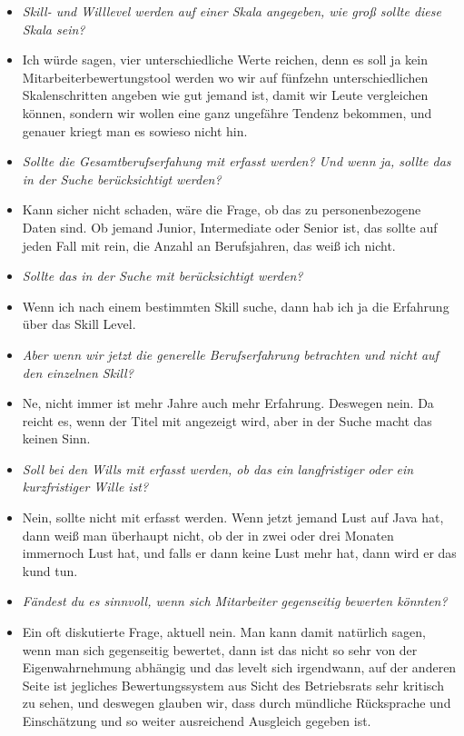 \begin{appendices}
\begin{itemize}
\item[] \textit{Skill- und Willlevel werden auf einer Skala angegeben, wie groß sollte diese Skala sein?}
\item[] Ich würde sagen, vier unterschiedliche Werte reichen, denn es soll ja kein Mitarbeiterbewertungstool werden wo wir auf fünfzehn unterschiedlichen Skalenschritten angeben wie gut jemand ist, damit wir Leute vergleichen können, sondern wir wollen eine ganz ungefähre Tendenz bekommen, und genauer kriegt man es sowieso nicht hin.

\item[] \textit{Sollte die Gesamtberufserfahung mit erfasst werden? Und wenn ja, sollte das in der Suche berücksichtigt werden?}
\item[] Kann sicher nicht schaden, wäre die Frage, ob das zu personenbezogene Daten sind. Ob jemand Junior, Intermediate oder Senior ist, das sollte auf jeden Fall mit rein, die Anzahl an Berufsjahren, das weiß ich nicht.

\item[] \textit{Sollte das in der Suche mit berücksichtigt werden?}
\item[] Wenn ich nach einem bestimmten Skill suche, dann hab ich ja die Erfahrung über das Skill Level.

\item[] \textit{Aber wenn wir jetzt die generelle Berufserfahrung betrachten und nicht auf den einzelnen Skill?}
\item[] Ne, nicht immer ist mehr Jahre auch mehr Erfahrung. Deswegen nein. Da reicht es, wenn der Titel mit angezeigt wird, aber in der Suche macht das keinen Sinn.

\item[] \textit{Soll bei den Wills mit erfasst werden, ob das ein langfristiger oder ein kurzfristiger Wille ist?}
\item[] Nein, sollte nicht mit erfasst werden. Wenn jetzt jemand Lust auf Java hat, dann weiß man überhaupt nicht, ob der in zwei oder drei Monaten immernoch Lust hat, und falls er dann keine Lust mehr hat, dann wird er das kund tun.

\item[] \textit{Fändest du es sinnvoll, wenn sich Mitarbeiter gegenseitig bewerten könnten?}
\item[] Ein oft diskutierte Frage, aktuell nein. Man kann damit natürlich sagen, wenn man sich gegenseitig bewertet, dann ist das nicht so sehr von der Eigenwahrnehmung abhängig und das levelt sich irgendwann, auf der anderen Seite ist jegliches Bewertungssystem aus Sicht des Betriebsrats sehr kritisch zu sehen, und deswegen glauben wir, dass durch mündliche Rücksprache und Einschätzung und so weiter ausreichend Ausgleich gegeben ist.


\end{itemize}
\end{appendices}
